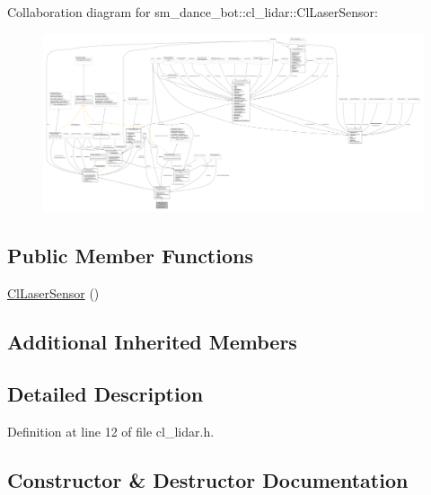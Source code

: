Collaboration diagram for sm\+\_\+dance\+\_\+bot\+:\+:cl\+\_\+lidar\+:\+:Cl\+Laser\+Sensor\+:
\nopagebreak
\begin{figure}[H]
\begin{center}
\leavevmode
\includegraphics[width=350pt]{classsm__dance__bot_1_1cl__lidar_1_1ClLaserSensor__coll__graph}
\end{center}
\end{figure}
\subsection*{Public Member Functions}
\begin{DoxyCompactItemize}
\item 
\hyperlink{classsm__dance__bot_1_1cl__lidar_1_1ClLaserSensor_ab028161bd20f5c6be3f5dcc69d5815e3}{Cl\+Laser\+Sensor} ()
\end{DoxyCompactItemize}
\subsection*{Additional Inherited Members}


\subsection{Detailed Description}


Definition at line 12 of file cl\+\_\+lidar.\+h.



\subsection{Constructor \& Destructor Documentation}

